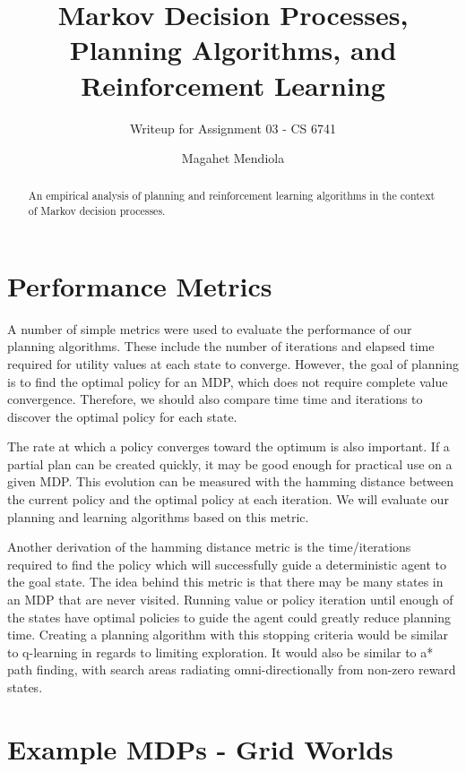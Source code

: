 \documentclass{sig-alternate}
\begin{document}
\title{Markov Decision Processes, Planning Algorithms, and Reinforcement Learning}
\subtitle{Writeup for Assignment 03 - CS 6741}

\author{
\alignauthor
Magahet Mendiola
}
\date{}

\maketitle
\begin{abstract}
An empirical analysis of planning and reinforcement learning algorithms in the context of Markov decision processes.
\end{abstract}

\section{Performance Metrics}

A number of simple metrics were used to evaluate the performance of our planning algorithms. These include the number of iterations and elapsed time required for utility values at each state to converge. However, the goal of planning is to find the optimal policy for an MDP, which does not require complete value convergence. Therefore, we should also compare time time and iterations to discover the optimal policy for each state.

The rate at which a policy converges toward the optimum is also important. If a partial plan can be created quickly, it may be good enough for practical use on a given MDP. This evolution can be measured with the hamming distance between the current policy and the optimal policy at each iteration. We will evaluate our planning and learning algorithms based on this metric.

Another derivation of the hamming distance metric is the time/iterations required to find the policy which will successfully guide a deterministic agent to the goal state. The idea behind this metric is that there may be many states in an MDP that are never visited. Running value or policy iteration until enough of the states have optimal policies to guide the agent could greatly reduce planning time. Creating a planning algorithm with this stopping criteria would be similar to q-learning in regards to limiting exploration. It would also be similar to a* path finding, with search areas radiating omni-directionally from non-zero reward states.


\section{Example MDPs - Grid Worlds}
\end{document}
